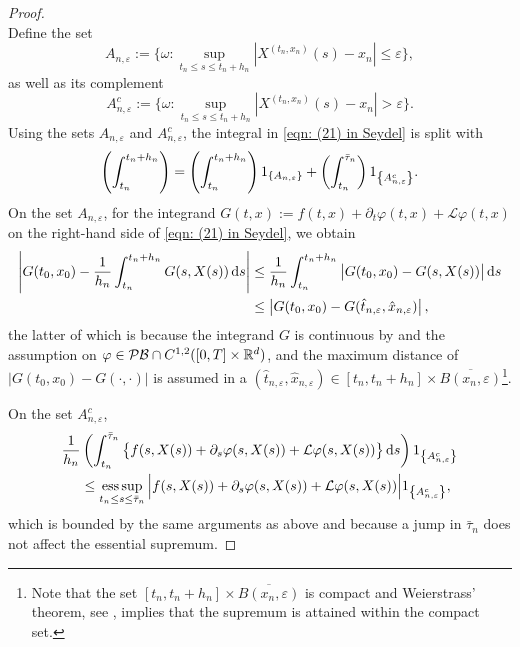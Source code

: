 \begin{proof}
\begin{equation*}
    \end{equation*}
    Define the set
    \begin{equation*}
        A_{n,\varepsilon} := \{ \omega : \sup_{t_n \leq s \leq t_n + h_n} |X^{(t_n,x_n)}(s) - x_n| \leq \varepsilon \},
    \end{equation*}
    as well as its complement
    \begin{equation*}
        A_{n,\varepsilon}^c := \{ \omega : \sup_{t_n \leq s \leq t_n + h_n} |X^{(t_n,x_n)}(s) - x_n| > \varepsilon \}.
    \end{equation*}
    Using the sets $A_{n,\varepsilon}$ and $A_{n,\varepsilon}^c$, the integral in \eqref{eqn: (21) in Seydel} is split with
    \begin{equation}
        \left( \int_{t_n}^{t_n+h_n}\right) = \left( \int_{t_n}^{t_n+h_n}\right) 1_{\left\{A_{n,\varepsilon}\right\}} + \left( \int_{t_n}^{\bar \tau_n}\right) 1_{\left\{A_{n,\varepsilon}^c\right\}}.
        \label{eqn: Theorem 4.9, split equation}
    \end{equation}
    On the set $A_{n,\varepsilon}$, for the integrand $G(t,x) := f(t,x) + \partial_t \varphi (t,x) + \mathcal L \varphi(t,x)$ on the right-hand side of \eqref{eqn: (21) in Seydel}, we obtain
    \begin{align}
        \left| G(t_0,x_0) - \frac{1}{h_n} \int_{t_n}^{t_n+h_n} G(s,X(s)) \,\mathrm{d} s \right| &\leq \frac{1}{h_n} \int_{t_n}^{t_n+h_n} \big| G(t_0,x_0) - G(s,X(s))\big| \,\mathrm{d} s \nonumber \\
        & \leq \left| G(t_0,x_0) - G(\hat{t}_{n,\varepsilon},\hat{x}_{n,\varepsilon}) \right|,
        \label{eqn: (22) in Seydel}
    \end{align}
    the latter of which is because the integrand $G$ is continuous by  and the assumption on $\varphi \in \mathcal{PB} \cap C^{1,2}([0,T] \times \mathbb{R}^d)$, and the maximum distance of $|G(t_0,x_0) - G(\cdot, \cdot)|$ is assumed in a $(\hat{t}_{n,\varepsilon},\hat{x}_{n,\varepsilon}) \in [t_n, t_n + h_n] \times \overline{B(x_n,\varepsilon)}$\footnote{Note that the set $[t_n,t_n+h_n] \times \overline{B(x_n,\varepsilon)}$ is compact and Weierstrass' theorem, see \cite[Theorem 3.12 (Extreme-value theorem)]{ProtterMorrey1991FirstCourseRealAnalysis}, implies that the supremum is attained within the compact set.}.

    On the set $A_{n,\varepsilon}^c$,
    \begin{align*}
        \frac{1}{h_n} & \left( \int_{t_n}^{\bar \tau_n} \big\{f(s,X(s)) + \partial_s \varphi(s,X(s)) + \mathcal{L}\varphi(s,X(s)) \big\} \,\mathrm{d} s \right) 1_{\left\{A_{n,\varepsilon}^c\right\}} \\
        & \leq \operatorname*{ess\,sup}_{t_n \leq s \leq \Bar{\tau}_n} \Big| f(s,X(s)) + \partial_s \varphi(s,X(s)) + \mathcal L \varphi(s,X(s)) \Big| 1_{\left\{A_{n,\varepsilon}^c\right\}},
    \end{align*}
    which is bounded by the same arguments as above and because a jump in $\bar \tau_n$ does not affect the essential supremum. 


\end{proof}
